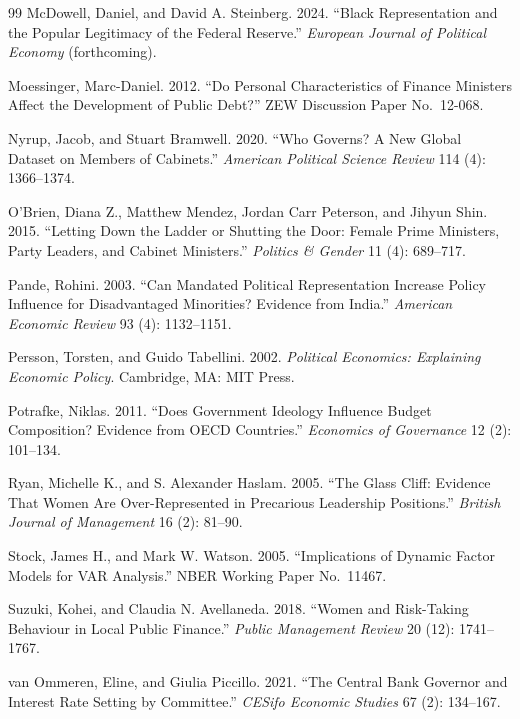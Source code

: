 \documentclass[12pt]{article}
\begin{document}
\begin{thebibliography}{99}
McDowell, Daniel, and David A. Steinberg. 2024. ``Black Representation
and the Popular Legitimacy of the Federal Reserve.''
\textit{European Journal of Political Economy} (forthcoming).

Moessinger, Marc-Daniel. 2012. ``Do Personal Characteristics of
Finance Ministers Affect the Development of Public Debt?'' ZEW
Discussion Paper No.~12-068.

Nyrup, Jacob, and Stuart Bramwell. 2020. ``Who Governs? A New Global
Dataset on Members of Cabinets.'' 
\textit{American Political Science
Review} 114 (4): 1366--1374.

O'Brien, Diana Z., Matthew Mendez, Jordan Carr Peterson, and Jihyun
Shin. 2015. ``Letting Down the Ladder or Shutting the Door: Female
Prime Ministers, Party Leaders, and Cabinet Ministers.''
\textit{Politics \& Gender} 11 (4): 689--717.

Pande, Rohini. 2003. ``Can Mandated Political Representation Increase
Policy Influence for Disadvantaged Minorities? Evidence from India.''
\textit{American Economic Review} 93 (4): 1132--1151.

Persson, Torsten, and Guido Tabellini. 2002. \textit{Political
Economics: Explaining Economic Policy}. Cambridge, MA: MIT Press.

Potrafke, Niklas. 2011. ``Does Government Ideology Influence Budget
Composition? Evidence from OECD Countries.'' 
\textit{Economics of
Governance} 12 (2): 101--134.

Ryan, Michelle K., and S. Alexander Haslam. 2005. ``The Glass Cliff:
Evidence That Women Are Over-Represented in Precarious Leadership
Positions.'' 
\textit{British Journal of Management} 16 (2): 81--90.

Stock, James H., and Mark W. Watson. 2005. ``Implications of Dynamic
Factor Models for VAR Analysis.'' NBER Working Paper No.~11467.

Suzuki, Kohei, and Claudia N. Avellaneda. 2018. ``Women and
Risk-Taking Behaviour in Local Public Finance.'' 
\textit{Public
Management Review} 20 (12): 1741--1767.

van Ommeren, Eline, and Giulia Piccillo. 2021. ``The Central Bank
Governor and Interest Rate Setting by Committee.'' 
\textit{CESifo
Economic Studies} 67 (2): 134--167.

\end{thebibliography}
\end{document}
